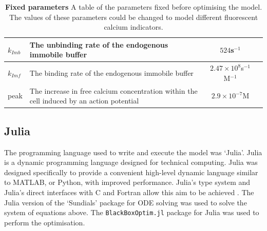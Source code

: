 \begin{table}
\begin{tabular}[t]{|l|p{6cm}|c|c|}
        $k_{Imb}$           & The unbinding rate of the endogenous immobile buffer                                     & $524$s$^{-1}$                         &  \parencite{bartol} \\ \hline
        $k_{Imf}$           & The binding rate of the endogenous immobile buffer                                       & $2.47 \times 10^{8}$s$^{-1}$M$^{-1}$  &  \parencite{bartol} \\ \hline
        peak                & The increase in free calcium concentration within the cell induced by an action potential & $2.9 \times 10^{-7}$M                 &  \parencite{maravall} \\ \hline
    \end{tabular}
    \caption{\textbf{Fixed parameters} A table of the parameters fixed before optimising the model. The values of these parameters could be changed to model different fluorescent calcium indicators.}
    \label{tab:fixed_parameters}
\end{table}

\subsection{Julia}
The programming language used to write and execute the model was `Julia'. Julia is a dynamic programming language designed for technical computing. Julia was designed specifically to provide a convenient high-level dynamic language similar to MATLAB, or Python, with improved performance. Julia's type system and Julia’s direct interfaces with C and Fortran allow this aim to be achieved  \parencite{bezanson}. The Julia version of the `Sundials' package for ODE solving was used to solve the system of equations above. The \texttt{BlackBoxOptim.jl} package for Julia was used to perform the optimisation.

